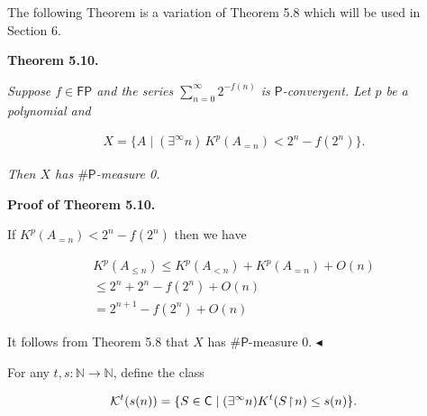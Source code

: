 \documentclass[10pt,a4paper]{article}
\begin{document}



The following Theorem is a variation of Theorem 5.8 which will be used in Section 6.\par





\par\medskip\noindent\textbf{
\textbf{Theorem 5.10}\textbf{.}
}\par



\emph{Suppose $f\in\mathsf{FP}$ and the series $\sum\limits_{n=0}^{\infty}2^{-f(n)}$ is $\mathsf{P}$-convergent.
Let $p$ be a polynomial and}\par


\[\begin{gathered}
X=\{A\mid(\exists^{\infty}n)\,K^{p}(A_{=n})<2^{n}-f(2^{n})\}.
\end{gathered}\]


\emph{Then $X$ has ${\mathsf{\#}\mathsf{P}}$-measure 0.}\par







\par\medskip\noindent\textbf{Proof of Theorem 5.10.}\par




If $K^{p}(A_{=n})<2^{n}-f(2^{n})$ then we have\par


\[\begin{gathered}
\displaystyle K^{p}(A_{\leq n}) \displaystyle\leq \displaystyle K^{p}(A_{<n})+K^{p}(A_{=n})+O(n) \\
\displaystyle\leq \displaystyle 2^{n}+2^{n}-f(2^{n})+O(n) \\
\displaystyle= \displaystyle 2^{n+1}-f(2^{n})+O(n)
\end{gathered}\]


It follows from Theorem 5.8 that $X$ has ${\mathsf{\#}\mathsf{P}}$-measure 0.
$\blacktriangleleft$\par




For any $t,s:\mathbb{N}\to\mathbb{N}$, define the class\par


\[\begin{gathered}
{\cal K}^{t}(s(n))=\{S\in\mathsf{C}\mid(\exists^{\infty}n)K^{t}(S\negthinspace\upharpoonright\negthinspace n)\leq s(n)\}.
\end{gathered}\]
\end{document}
